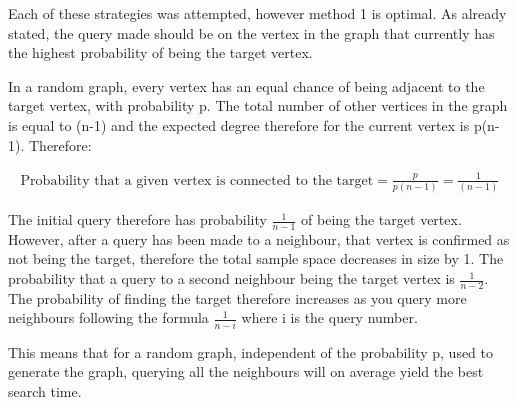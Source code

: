 \documentclass[12pt,a4paper]{article}
\begin{document}
Each of these strategies was attempted, however method 1 is optimal. As already stated, the query made should be on the vertex in the graph that currently has the highest probability of being the target vertex.

In a random graph, every vertex has an equal chance of being adjacent to the target vertex, with probability p. The total number of other vertices in the graph is equal to (n-1) and the expected degree therefore for the current vertex is p(n-1). Therefore:

\begin{align*}
	\text{Probability that a given vertex is connected to the target} = \frac{p}{p(n-1)} = \frac{1}{(n-1)}
\end{align*} 

The initial query therefore has probability $\frac{1}{n-1}$ of being the target vertex. However, after a query has been made to a neighbour, that vertex is confirmed as not being the target, therefore the total sample space decreases in size by 1. The probability that a query to a second neighbour being the target vertex is $\frac{1}{n-2}$. The probability of finding the target therefore increases as you query more neighbours following the formula $\frac{1}{n-i}$ where i is the query number.

This means that for a random graph, independent of the probability p, used to generate the graph, querying all the neighbours will on average yield the best search time.
\end{document}
